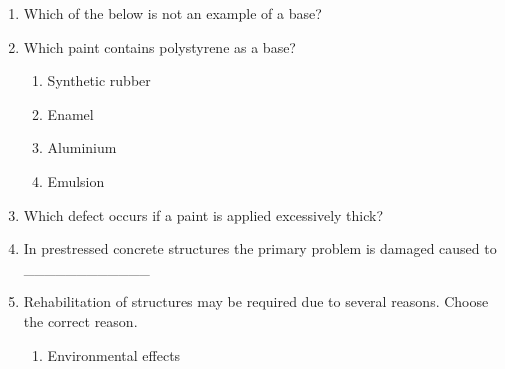 \documentclass[11pt,a4paper]{article}
\begin{document}
\begin{enumerate}
\item{Which of the below is not an example of a base?}
\\
\item{Which paint contains polystyrene as a base?}
\begin{enumerate}[label=\Alph*.]
\item{Synthetic rubber}
\item{Enamel}
\item{Aluminium}
\item{Emulsion}
\end{enumerate}
\item{Which defect occurs if a paint is applied excessively thick?}
\\
\item{In prestressed concrete structures the primary problem is damaged caused to \_\_\_\_\_\_\_\_\_\_\_\_}
\\
\item{Rehabilitation of structures may be required due to several reasons. Choose the correct reason.}
\begin{enumerate}[label=\Alph*.]
\item{Environmental effects}

\end{enumerate}
\end{enumerate}
\end{document}
